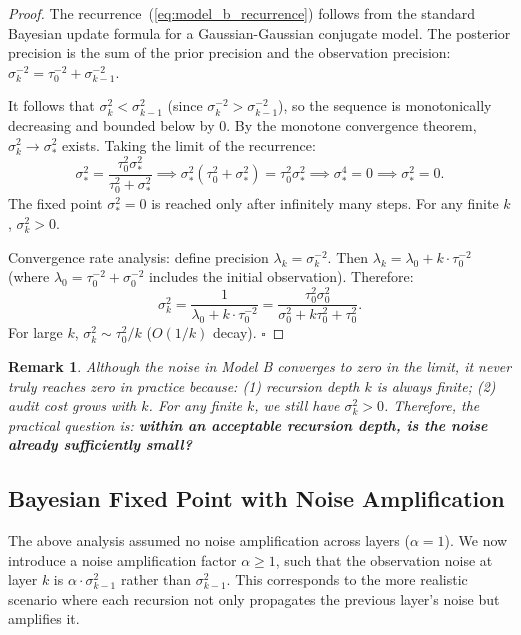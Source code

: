 \documentclass[12pt,a4paper]{article}
\newtheorem{remark}[theorem]{Remark}
\theoremstyle{definition}
\begin{document}
\begin{proof}
The recurrence~(\ref{eq:model_b_recurrence}) follows from the standard Bayesian update formula for a Gaussian-Gaussian conjugate model. The posterior precision is the sum of the prior precision and the observation precision: $\sigma_k^{-2} = \tau_0^{-2} + \sigma_{k-1}^{-2}$.

It follows that $\sigma_k^2 < \sigma_{k-1}^2$ (since $\sigma_k^{-2} > \sigma_{k-1}^{-2}$), so the sequence is monotonically decreasing and bounded below by $0$. By the monotone convergence theorem, $\sigma_k^2 \to \sigma_*^2$ exists. Taking the limit of the recurrence:
\begin{equation*}
    \sigma_*^2 = \frac{\tau_0^2 \sigma_*^2}{\tau_0^2 + \sigma_*^2} \implies \sigma_*^2(\tau_0^2 + \sigma_*^2) = \tau_0^2 \sigma_*^2 \implies \sigma_*^4 = 0 \implies \sigma_*^2 = 0.
\end{equation*}
The fixed point $\sigma_*^2 = 0$ is reached only after infinitely many steps. For any finite $k$, $\sigma_k^2 > 0$.

Convergence rate analysis: define precision $\lambda_k = \sigma_k^{-2}$. Then $\lambda_k = \lambda_0 + k \cdot \tau_0^{-2}$ (where $\lambda_0 = \tau_0^{-2} + \sigma_0^{-2}$ includes the initial observation). Therefore:
\begin{equation}\label{eq:precision_linear}
    \sigma_k^2 = \frac{1}{\lambda_0 + k \cdot \tau_0^{-2}} = \frac{\tau_0^2 \sigma_0^2}{\sigma_0^2 + k \tau_0^2 + \tau_0^2}.
\end{equation}
For large $k$, $\sigma_k^2 \sim \tau_0^2 / k$ ($O(1/k)$ decay). \hfill$\square$
\end{proof}

\begin{remark}
Although the noise in Model B converges to zero in the limit, it never truly reaches zero in practice because: (1) recursion depth $k$ is always finite; (2) audit cost grows with $k$. For any finite $k$, we still have $\sigma_k^2 > 0$. Therefore, the practical question is: \textbf{within an acceptable recursion depth, is the noise already sufficiently small?}
\end{remark}

\subsection{Bayesian Fixed Point with Noise Amplification}

\noindent
The above analysis assumed no noise amplification across layers ($\alpha=1$). We now introduce a noise amplification factor $\alpha \geq 1$, such that the observation noise at layer $k$ is $\alpha \cdot \sigma_{k-1}^2$ rather than $\sigma_{k-1}^2$. This corresponds to the more realistic scenario where each recursion not only propagates the previous layer's noise but amplifies it.
\end{document}
